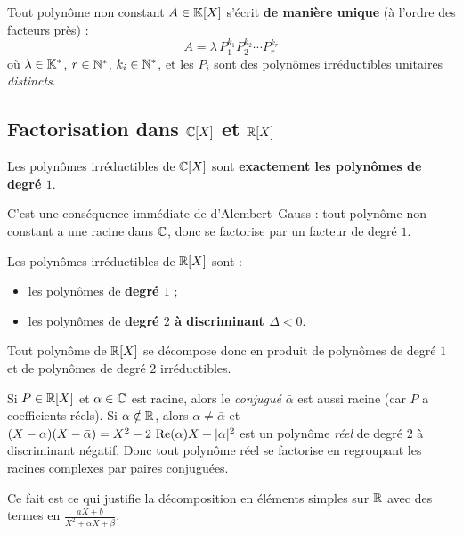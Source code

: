 \begin{thmbox}
Tout polynôme non constant $A \in \mathbb{K}[X]$ s'écrit \textbf{de manière unique} (à l'ordre des facteurs près) :
\[
  A = \lambda \, P_1^{k_1} P_2^{k_2} \cdots P_r^{k_r}
\]
où $\lambda \in \mathbb{K}^*$, $r \in \mathbb{N}^*$, $k_i \in \mathbb{N}^*$, et les $P_i$ sont des polynômes irréductibles unitaires \emph{distincts}.
\end{thmbox}

\subsection{Factorisation dans $\mathbb{C}[X]$ et $\mathbb{R}[X]$}

\begin{thmbox}
Les polynômes irréductibles de $\mathbb{C}[X]$ sont \textbf{exactement les polynômes de degré $1$}.
\end{thmbox}

C'est une conséquence immédiate de d'Alembert--Gauss : tout polynôme non constant a une racine dans $\mathbb{C}$, donc se factorise par un facteur de degré $1$.

\begin{thmbox}
Les polynômes irréductibles de $\mathbb{R}[X]$ sont :
\begin{itemize}[leftmargin=1cm]
  \item les polynômes de \textbf{degré $1$} ;
  \item les polynômes de \textbf{degré $2$ à discriminant $\Delta < 0$}.
\end{itemize}

Tout polynôme de $\mathbb{R}[X]$ se décompose donc en produit de polynômes de degré $1$ et de polynômes de degré $2$ irréductibles.
\end{thmbox}

\begin{intuitionbox}
Si $P \in \mathbb{R}[X]$ et $\alpha \in \mathbb{C}$ est racine, alors le \emph{conjugué} $\bar\alpha$ est aussi racine (car $P$ a coefficients réels). Si $\alpha \notin \mathbb{R}$, alors $\alpha \neq \bar\alpha$ et $(X - \alpha)(X - \bar\alpha) = X^2 - 2\,\operatorname{Re}(\alpha) X + |\alpha|^2$ est un polynôme \emph{réel} de degré $2$ à discriminant négatif. Donc tout polynôme réel se factorise en regroupant les racines complexes par paires conjuguées.

Ce fait est ce qui justifie la décomposition en éléments simples sur $\mathbb{R}$ avec des termes en $\frac{aX + b}{X^2 + \alpha X + \beta}$.
\end{intuitionbox}

